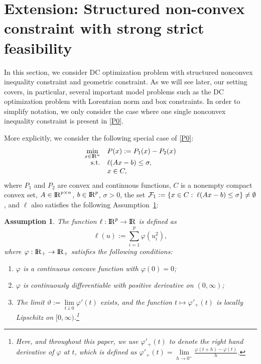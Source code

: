 \documentclass[10pt]{article}
\numberwithin{equation}{section}
\newtheorem{assumption}{Assumption}[section]
\def\R{{\rm I\!R}}
\begin{document}
\section{Extension: Structured non-convex constraint with strong strict feasibility}\label{sec4}

In this section, we consider DC optimization problem with structured nonconvex inequality constraint and geometric constraint. As we will see later, our setting covers, in particular, several important model problems such as the DC optimization problem with Lorentzian norm and box constraints. In order to simplify notation, we only consider the case where one single nonconvex inequality constraint is present in \eqref{P0}.

More explicitly, we consider the following special case of \eqref{P0}:
\begin{equation}\label{P1}
  \begin{array}{rl}
\min\limits_{x\in\R^n} & P(x) := P_1(x) - P_2(x)\\
{\rm s.t.} & \ell(Ax - b)\leq \sigma,\\
           & x\in C,
  \end{array}
\end{equation}
where $P_1$ and $P_2$ are convex and continuous functions, $C$ is a nonempty compact convex set, $A\in\R^{p\times n}$, $b\in\R^p$,  $\sigma >0$, the set ${\cal F}_1:= \{x\in C:\; \ell(Ax - b)\le \sigma\}\neq \emptyset$, and $\ell$ also satisfies the following Assumption~\ref{gassum}:
\begin{assumption}\label{gassum}
The function $\ell:\R^p\to \R$ is defined as
\[
\ell(u):= \sum_{i=1}^{p} \varphi(u_i^2),
\]
where $\varphi:\R_+\rightarrow \R_+$ satisfies the following conditions:
\begin{enumerate}[{\rm (i)}]
  \item $\varphi$ is a continuous concave function with $\varphi(0) = 0$;
  \item $\varphi$ is continuously differentiable with positive derivative on $(0, \infty)$;
  \item The limit $\vartheta:= \lim\limits_{t\downarrow 0}\varphi'(t)$ exists, and the function $t\mapsto \varphi'_+(t)$ is locally Lipschitz on $[0,\infty)$.\footnote{Here, and throughout this paper, we use $\varphi'_+(t)$ to denote the right hand derivative of $\varphi$ at $t$, which is defined as $\varphi'_+(t)=\lim\limits_{h \rightarrow 0^+}\frac{\varphi(t+h)-\varphi(t)}{h}$.}
\end{enumerate}
\end{assumption}
\end{document}
